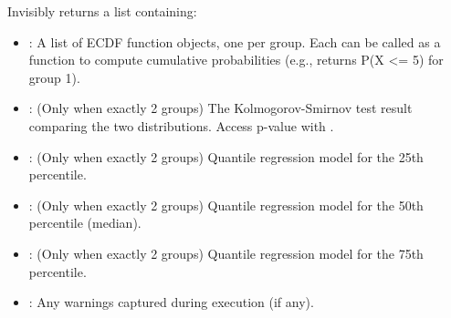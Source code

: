 \documentclass[a4paper]{book}
\begin{document}
%
\begin{Value}
Invisibly returns a list containing:
\begin{itemize}

\item{} : A list of ECDF function objects, one per group. Each can be
called as a function to compute cumulative probabilities (e.g., 
returns P(X <= 5) for group 1).
\item{} : (Only when exactly 2 groups) The Kolmogorov-Smirnov test result
comparing the two distributions. Access p-value with .
\item{} : (Only when exactly 2 groups) Quantile regression
model for the 25th percentile.
\item{} : (Only when exactly 2 groups) Quantile regression
model for the 50th percentile (median).
\item{} : (Only when exactly 2 groups) Quantile regression
model for the 75th percentile.
\item{} : Any warnings captured during execution (if any).

\end{itemize}

\end{Value}
%
\end{document}
